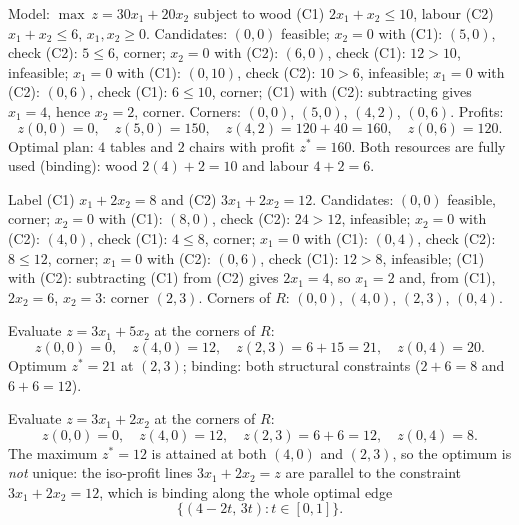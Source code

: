 \begin{solutions}
  \item Model: $\max\ z=30x_{1}+20x_{2}$ subject to wood (C1)
        $2x_{1}+x_{2}\le 10$, labour (C2) $x_{1}+x_{2}\le 6$,
        $x_{1},x_{2}\ge 0$. Candidates: $(0,0)$ feasible; $x_{2}=0$
        with (C1): $(5,0)$, check (C2): $5\le 6$, corner; $x_{2}=0$
        with (C2): $(6,0)$, check (C1): $12>10$, infeasible; $x_{1}=0$
        with (C1): $(0,10)$, check (C2): $10>6$, infeasible; $x_{1}=0$
        with (C2): $(0,6)$, check (C1): $6\le 10$, corner; (C1) with
        (C2): subtracting gives $x_{1}=4$, hence $x_{2}=2$, corner.
        Corners: $(0,0)$, $(5,0)$, $(4,2)$, $(0,6)$. Profits:
        \[
          z(0,0)=0,\quad z(5,0)=150,\quad z(4,2)=120+40=160,\quad
          z(0,6)=120 .
        \]
        Optimal plan: $4$ tables and $2$ chairs with profit
        $z^{*}=160$. Both resources are fully used (binding): wood
        $2(4)+2=10$ and labour $4+2=6$.

  \item Label (C1) $x_{1}+2x_{2}=8$ and (C2) $3x_{1}+2x_{2}=12$.
        Candidates: $(0,0)$ feasible, corner; $x_{2}=0$ with (C1):
        $(8,0)$, check (C2): $24>12$, infeasible; $x_{2}=0$ with (C2):
        $(4,0)$, check (C1): $4\le 8$, corner; $x_{1}=0$ with (C1):
        $(0,4)$, check (C2): $8\le 12$, corner; $x_{1}=0$ with (C2):
        $(0,6)$, check (C1): $12>8$, infeasible; (C1) with (C2):
        subtracting (C1) from (C2) gives $2x_{1}=4$, so $x_{1}=2$ and,
        from (C1), $2x_{2}=6$, $x_{2}=3$: corner $(2,3)$. Corners of
        $R$: $(0,0)$, $(4,0)$, $(2,3)$, $(0,4)$.

  \item Evaluate $z=3x_{1}+5x_{2}$ at the corners of $R$:
        \[
          z(0,0)=0,\quad z(4,0)=12,\quad z(2,3)=6+15=21,\quad
          z(0,4)=20 .
        \]
        Optimum $z^{*}=21$ at $(2,3)$; binding: both structural
        constraints ($2+6=8$ and $6+6=12$).

  \item Evaluate $z=3x_{1}+2x_{2}$ at the corners of $R$:
        \[
          z(0,0)=0,\quad z(4,0)=12,\quad z(2,3)=6+6=12,\quad
          z(0,4)=8 .
        \]
        The maximum $z^{*}=12$ is attained at both $(4,0)$ and
        $(2,3)$, so the optimum is \emph{not} unique: the iso-profit
        lines $3x_{1}+2x_{2}=z$ are parallel to the constraint
        $3x_{1}+2x_{2}=12$, which is binding along the whole optimal
        edge
        \[
          \{(4-2t,\,3t):t\in[0,1]\} .
        \]


\end{solutions}
